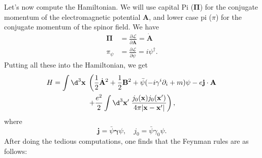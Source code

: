 \documentclass[a4paper]{article}
\begin{document}
Let's now compute the Hamiltonian. We will use capital Pi ($\boldsymbol\Pi$) for the conjugate momentum of the electromagnetic potential $\mathbf{A}$, and lower case pi ($\pi$) for the conjugate momentum of the spinor field. We have
\begin{align*}
  \boldsymbol\Pi &= \frac{\partial \mathcal{L}}{\partial \dot{\mathbf{A}}} = \dot{\mathbf{A}}\\
  \pi_\psi &= \frac{\partial \mathcal{L}}{\partial \dot{\psi}} = i \psi^\dagger.
\end{align*}
Putting all these into the Hamiltonian, we get
\begin{multline*}
  H = \int \d^3 \mathbf{x}\; \left(\frac{1}{2} \dot{\mathbf{A}}^2 + \frac{1}{2} \mathbf{B}^2 + \bar\psi (-i \gamma^i \partial_i + m) \psi - e\mathbf{j}\cdot \mathbf{A} \right.\\
  \left.+ \frac{e^2}{2} \int \d^3 \mathbf{x}'\;\frac{j_0(\mathbf{x}) j_0(\mathbf{x}')}{4\pi |\mathbf{x} - \mathbf{x}'|}\right),
\end{multline*}
where
\[
  \mathbf{j} = \bar\psi \boldsymbol\gamma \psi,\quad j_0 = \bar\psi \gamma_0 \psi.
\]
After doing the tedious computations, one finds that the Feynman rules are as follows:
\end{document}
